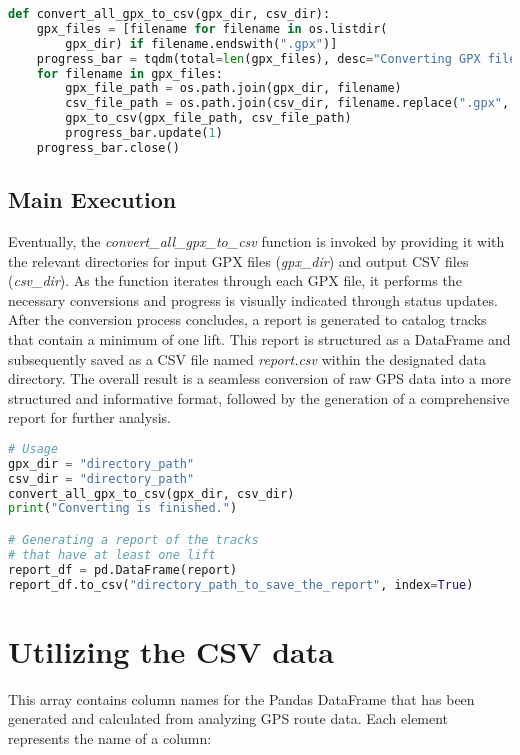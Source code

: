 \begin{lstlisting}[language=Python]
def convert_all_gpx_to_csv(gpx_dir, csv_dir):
    gpx_files = [filename for filename in os.listdir(
        gpx_dir) if filename.endswith(".gpx")]
    progress_bar = tqdm(total=len(gpx_files), desc="Converting GPX files")
    for filename in gpx_files:
        gpx_file_path = os.path.join(gpx_dir, filename)
        csv_file_path = os.path.join(csv_dir, filename.replace(".gpx", ".csv"))
        gpx_to_csv(gpx_file_path, csv_file_path)
        progress_bar.update(1)
    progress_bar.close()
\end{lstlisting}

\subsection{Main Execution}
\label{sec:data:main}

Eventually, the \textit{convert\_all\_gpx\_to\_csv} function is invoked by providing it with the relevant directories for input GPX files (\textit{gpx\_dir}) and output CSV files (\textit{csv\_dir}). 
As the function iterates through each GPX file, it performs the necessary conversions and progress is visually indicated through status updates. After the conversion process concludes, 
a report is generated to catalog tracks that contain a minimum of one lift. This report is structured as a DataFrame and subsequently saved as a CSV file named 
\textit{report.csv} within the designated data directory. The overall result is a seamless conversion of raw 
GPS data into a more structured and informative format, followed by the generation of a comprehensive report for further analysis.

\begin{lstlisting}[language=Python]
# Usage
gpx_dir = "directory_path"
csv_dir = "directory_path"
convert_all_gpx_to_csv(gpx_dir, csv_dir)
print("Converting is finished.")

# Generating a report of the tracks 
# that have at least one lift
report_df = pd.DataFrame(report)
report_df.to_csv("directory_path_to_save_the_report", index=True)
\end{lstlisting}


\section{Utilizing the CSV data}
\label{sec:data-csv}

This array contains column names for the Pandas DataFrame that has been generated and calculated from analyzing GPS route data. Each element represents the name of a column:


